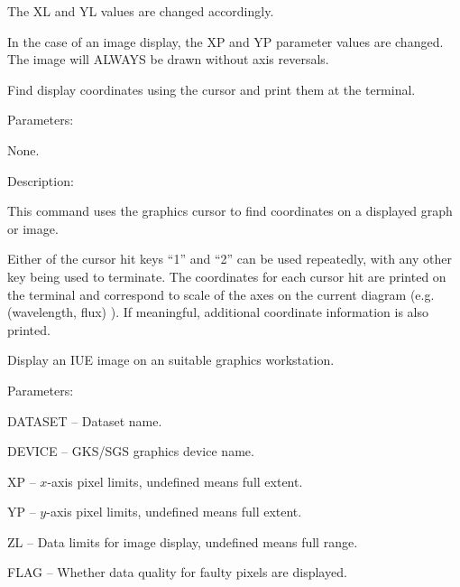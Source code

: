 \begin {description}
\begin {description}
The XL and YL values are changed accordingly.

In the case of an image display, the XP and YP parameter values
are changed. The image will ALWAYS be drawn without axis reversals.
\end {description}

\item [CURSOR]
Find display coordinates using the cursor and print them at the 
terminal.
                                                                
\begin {description}
\item Parameters:

\begin {description}
\item None.
\end {description}

\item Description:

This command uses the graphics cursor to find coordinates on a
displayed graph or image. 

Either of the cursor hit keys ``1'' and ``2'' can be used repeatedly, with
any other key being used to terminate.
The coordinates for each cursor hit are printed on the terminal and 
correspond to scale of the axes on the current diagram (e.g.
(wavelength, flux) ).
If meaningful, additional coordinate information is also printed.
\end {description}

\item [DRIMAGE]
Display an IUE image on an suitable graphics workstation.

\begin {description}
\item Parameters:

\begin {description}
\item DATASET -- Dataset name.
\item DEVICE -- GKS/SGS graphics device name.
\item XP -- $x$-axis pixel limits, undefined means full extent.
\item YP -- $y$-axis pixel limits, undefined means full extent.
\item ZL -- Data limits for image display, undefined means full range.
\item FLAG -- Whether data quality for faulty pixels are displayed.
\end {description}


\end{description}
\end{description}
